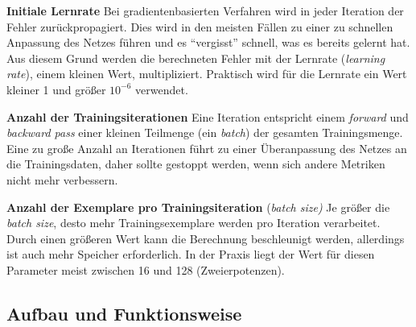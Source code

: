\textbf{Initiale Lernrate} Bei gradientenbasierten Verfahren wird in jeder Iteration der Fehler zurückpropagiert. Dies wird in den meisten Fällen zu einer zu schnellen Anpassung des Netzes führen und es \enquote{vergisst} schnell, was es bereits gelernt hat. Aus diesem Grund werden die berechneten Fehler mit der Lernrate (\textit{learning rate}), einem kleinen Wert, multipliziert. Praktisch wird für die Lernrate ein Wert kleiner 1 und größer $10^{-6}$ verwendet.\newline

\textbf{Anzahl der Trainingsiterationen} Eine Iteration entspricht einem \textit{forward} und \textit{backward pass} einer kleinen Teilmenge (ein \textit{batch}) der gesamten Trainingsmenge. Eine zu große Anzahl an Iterationen führt zu einer Überanpassung des Netzes an die Trainingsdaten, daher sollte gestoppt werden, wenn sich andere Metriken nicht mehr verbessern.\newline

\textbf{Anzahl der Exemplare pro Trainingsiteration} (\textit{batch size)} Je größer die \textit{batch size}, desto mehr Trainingsexemplare werden pro Iteration verarbeitet. Durch einen größeren Wert kann die Berechnung beschleunigt werden, allerdings ist auch mehr Speicher erforderlich. In der Praxis liegt der Wert für diesen Parameter meist zwischen 16 und 128 (Zweierpotenzen). 

\subsection{Aufbau und Funktionsweise}

